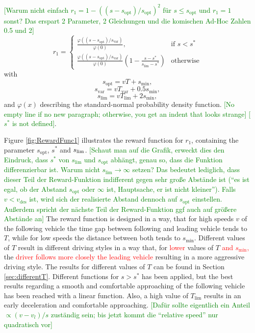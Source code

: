 \documentclass[review]{elsarticle}
\providecommand{\red}[1]{\textcolor{red}{#1}}
\providecommand{\green}[1]{\textcolor{green}{#1}}
\providecommand{\martin}[1]{\red{#1}} %
\providecommand{\martinc}[1]{\green{[#1]}} %
\providecommand{\sub}[1]{_{\mathrm{#1}}}  %
\providecommand{\3}{{\ss}}
\begin{document}
\martinc{Warum nicht einfach $r_1=1-((s-s\sub{opt})/s\sub{opt})^2$
  f\"ur $s\le s\sub{opt}$ und $r_1=1$ sonst? Das erspart 2
  Parameter, 2 Gleichungen und die komischen Ad-Hoc Zahlen 0.5 und 2}
\begin{equation}
\label{eq:r1}
r_1  = 
\begin{cases}
\frac{\varphi((s-s\sub{opt})/s\sub{var})}{\varphi(0)},
  & \text{if } s < s^*\\
\frac{\varphi((s-s\sub{opt})/s\sub{var})}{\varphi(0)}
 \left(1-\frac{s-s^*}{s\sub{lim} - s^*}\right)  & \text{otherwise}
\end{cases}
\end{equation}
with
\begin{equation}
\label{eq:r11}
s\sub{opt} = vT + s\sub{min},
\end{equation}
\begin{equation}
\label{eq:r12}
s\sub{var} = vT\sub{var} + 0.5s\sub{min},
\end{equation}
\begin{equation}
\label{eq:r13}
s\sub{lim} = vT\sub{lim} + 2s\sub{min},
\end{equation}
%
and $\varphi(x)$ describing the standard-normal probability density
function. \martinc{No empty line if no new paragraph; otherwise, you get an
  indent that looks strange] [$s^*$ is not defined}.

Figure \ref{fig:RewardFunc1} illustrates the reward function for
$r_1$, containing the parameter $s\sub{opt}$, $s^*$ and $s_{\rm
  lim}$. \martinc{Schaut man auf die Grafik, erweckt dies den
    Eindruck, dass $s^*$ von $s\sub{lim}$ und $s\sub{opt}$ abh\"angt,
    genau so, dass die Funktion differenzierbar ist. Warum nicht
    $s\sub{lim}\to \infty$ setzen? Das bedeutet lediglich, dass
    dieser Teil der Reward-Funktion indifferent gegen sehr gro\3e
    Abst\"ande ist (``es ist egal, ob der Abstand $s\sub{opt}$ oder
    $\infty$ ist, Hauptsache, er ist nicht kleiner''). Falls
    $v<v\sub{des}$ ist, wird sich der realisierte Abstand dennoch auf
    $s\sub{opt}$ einstellen. Au\3erdem spricht der n\"achste Teil der
    Reward-Funktion ggf auch auf gr\"o\3ere Abst\"ande an} 
The reward function is designed in a way, that for high speeds $v$
of the following vehicle the time gap between following and leading
vehicle tends to $T$, while for low speeds the distance
between both tends to $s\sub{min}$. Different values of $T$
result in different driving styles in a way that, for \martin{lower} values of
$T$ \martin{and $s\sub{min}$,} the \martin{driver follows
  more closely the leading vehicle} resulting in a more aggressive
driving style. The results for different values of $T$ can
be found in Section \ref{sec:differentT}. Different functions for $ s
> s^*$ has been applied, but the best results regarding a smooth and
comfortable approaching of the following vehicle has been reached with
a linear function. Also, a high value of $T\sub{lim}$ results in an
early deceleration and comfortable approaching. \martinc{Daf\"ur
  sollte eigentlich ein Anteil $\propto (v-v_l)/s$ zust\"andig sein;
  bis jetzt kommt die ``relative speed'' nur quadratisch vor} 
\end{document}
